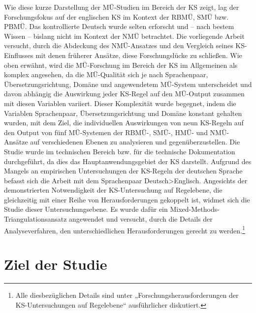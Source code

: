 Wie diese kurze Darstellung der MÜ-Studien im Bereich der KS zeigt, lag der Forschungsfokus auf der englischen KS im Kontext der RBMÜ, SMÜ bzw. PBMÜ. Das kontrollierte Deutsch wurde selten erforscht und – nach bestem Wissen – bislang nicht im Kontext der NMÜ betrachtet. Die vorliegende Arbeit versucht, durch die Abdeckung des NMÜ-Ansatzes und den Vergleich seines KS-Einflusses mit denen früherer Ansätze, diese Forschungslücke zu schließen. Wie oben erwähnt, wird die MÜ-Forschung im Bereich der KS im Allgemeinen als komplex angesehen, da die MÜ-Qualität sich je nach Sprachenpaar, Übersetzungsrichtung, Domäne und angewendetem MÜ-System unterscheidet und davon abhängig die Auswirkung jeder KS-Regel auf den MÜ-Output zusammen mit diesen Variablen variiert. Dieser Komplexität wurde begegnet, indem die Variablen Sprachenpaar, Übersetzungsrichtung und Domäne konstant gehalten wurden, mit dem Ziel, die individuellen Auswirkungen von neun KS-Regeln auf den Output von fünf MÜ-Systemen der RBMÜ-, SMÜ-, HMÜ- und NMÜ-Ansätze auf verschiedenen Ebenen zu analysieren und gegenüberzustellen. Die Studie wurde im technischen Bereich bzw. für die technische Dokumentation durchgeführt, da dies das Hauptanwendungsgebiet der KS darstellt. Aufgrund des Mangels an empirischen Untersuchungen der KS-Regeln der deutschen Sprache befasst sich die Arbeit mit dem Sprachenpaar Deutsch>Englisch. Angesichts der demonstrierten Notwendigkeit der KS-Untersuchung auf Regelebene, die gleichzeitig mit einer Reihe von Herausforderungen gekoppelt ist, widmet sich die Studie dieser Untersuchungsebene. Es wurde dafür ein Mixed-Methods-Triangulationsansatz angewendet und versucht, durch die Details der Analyseverfahren, den unterschiedlichen Herausforderungen gerecht zu werden.\footnote{{{{Alle diesbezüglichen Details sind unter  „Forschungsherausforderungen der KS-Untersuchungen auf Regelebene“ ausführlicher diskutiert.}}}}

\section{Ziel der Studie}\label{sec:1.2}

